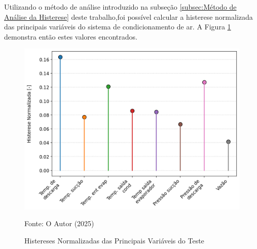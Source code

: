  Utilizando o método de análise introduzido na subseção \ref{subsec:Método de Análise da Histerese} deste trabalho,foi possível  calcular a histerese normalizada das principais variáveis do sistema de condicionamento de ar. A Figura \ref{fig:histereses normalizadas} demonstra então estes valores encontrados.
 \newpage
\begin{figure}[h] 

    \centering
    \includegraphics[width=1\linewidth]{FigurasdoTexto/Histereses Normalizadas.png}
    \caption{Histereses Normalizadas das Principais Variáveis do Teste}
    \label{fig:histereses normalizadas}
    {\footnotesize Fonte: O Autor (2025)}
\end{figure}

